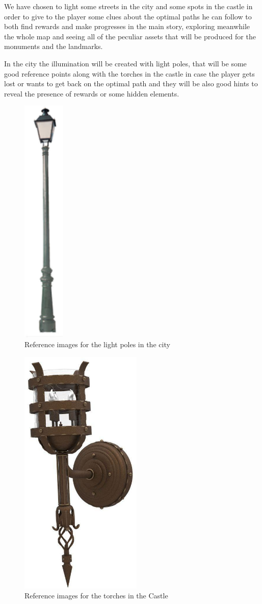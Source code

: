 We have chosen to light some streets in the city and some spots in the castle in order to give to the player some clues about the optimal paths he can follow to both find rewards and make progresses in the main story, exploring meanwhile the whole map and seeing all of the peculiar assets that will be produced for the monuments and the landmarks.

In the city the illumination will be created with light poles, that will be some good reference points along with the torches in the castle in case the player gets lost or wants to get back on the optimal path and they will be also good hints to reveal the presence of rewards or some hidden elements.

\begin{figure}[H]
  \centering
  \includegraphics[height=12cm]{Images/Landmarks/lightPole}
  \caption{Reference images for the light poles in the city}
\end{figure}

\begin{figure}[H]
  \centering
  \includegraphics[height=12cm]{Images/Landmarks/torch}
  \caption{Reference images for the torches in the Castle}
\end{figure}
